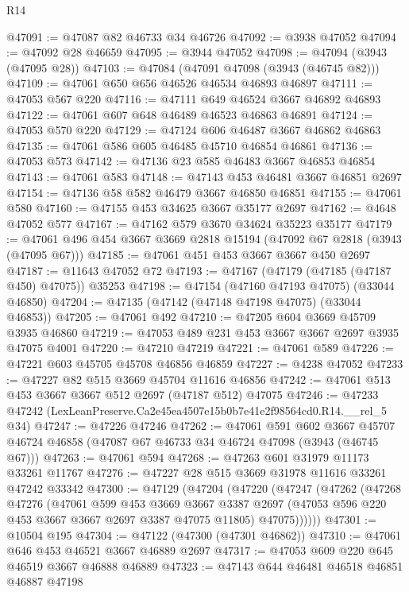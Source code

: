 \begin{lexlean}{R14}
\begin{coremodule}
@47091 := @47087 @82 @46733 @34 @46726
@47092 := @3938 @47052
@47094 := @47092 @28 @46659
@47095 := @3944 @47052
@47098 := @47094 (@3943 (@47095 @28))
@47103 := @47084 (@47091 @47098 (@3943 (@46745 @82)))
@47109 := @47061 @650 @656 @46526 @46534 @46893 @46897
@47111 := @47053 @567 @220
@47116 := @47111 @649 @46524 @3667 @46892 @46893
@47122 := @47061 @607 @648 @46489 @46523 @46863 @46891
@47124 := @47053 @570 @220
@47129 := @47124 @606 @46487 @3667 @46862 @46863
@47135 := @47061 @586 @605 @46485 @45710 @46854 @46861
@47136 := @47053 @573
@47142 := @47136 @23 @585 @46483 @3667 @46853 @46854
@47143 := @47061 @583
@47148 := @47143 @453 @46481 @3667 @46851 @2697
@47154 := @47136 @58 @582 @46479 @3667 @46850 @46851
@47155 := @47061 @580
@47160 := @47155 @453 @34625 @3667 @35177 @2697
@47162 := @4648 @47052 @577
@47167 := @47162 @579 @3670 @34624 @35223 @35177
@47179 := @47061 @496 @454 @3667 @3669 @2818 @15194 (@47092 @67 @2818 (@3943 (@47095 @67)))
@47185 := @47061 @451 @453 @3667 @3667 @450 @2697
@47187 := @11643 @47052 @72
@47193 := @47167 (@47179 (@47185 (@47187 @450) @47075)) @35253
@47198 := @47154 (@47160 @47193 @47075) (@33044 @46850)
@47204 := @47135 (@47142 (@47148 @47198 @47075) (@33044 @46853))
@47205 := @47061 @492
@47210 := @47205 @604 @3669 @45709 @3935 @46860
@47219 := @47053 @489 @231 @453 @3667 @3667 @2697 @3935 @47075 @4001
@47220 := @47210 @47219
@47221 := @47061 @589
@47226 := @47221 @603 @45705 @45708 @46856 @46859
@47227 := @4238 @47052
@47233 := @47227 @82 @515 @3669 @45704 @11616 @46856
@47242 := @47061 @513 @453 @3667 @3667 @512 @2697 (@47187 @512) @47075
@47246 := @47233 @47242 (LexLeanPreserve.Ca2e45ea4507e15b0b7e41e2f98564cd0.R14.__rel_5 @34)
@47247 := @47226 @47246
@47262 := @47061
    @591
    @602
    @3667
    @45707
    @46724
    @46858
    (@47087 @67 @46733 @34 @46724 @47098 (@3943 (@46745 @67)))
@47263 := @47061 @594
@47268 := @47263 @601 @31979 @11173 @33261 @11767
@47276 := @47227 @28 @515 @3669 @31978 @11616 @33261 @47242 @33342
@47300 := @47129
    (@47204
      (@47220
        (@47247
          (@47262
            (@47268
              @47276
              (@47061
                @599
                @453
                @3669
                @3667
                @3387
                @2697
                (@47053 @596 @220 @453 @3667 @3667 @2697 @3387 @47075 @11805)
                @47075))))))
@47301 := @10504 @195
@47304 := @47122 (@47300 (@47301 @46862))
@47310 := @47061 @646 @453 @46521 @3667 @46889 @2697
@47317 := @47053 @609 @220 @645 @46519 @3667 @46888 @46889
@47323 := @47143 @644 @46481 @46518 @46851 @46887 @47198

\end{coremodule}
\end{lexlean}
